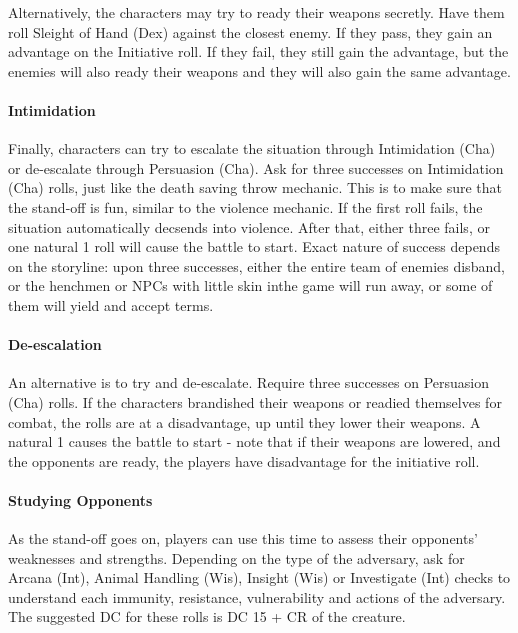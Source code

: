 \documentclass[twocolumn]{dndbook}
\begin{document}
Alternatively, the characters may try to ready their weapons secretly.
Have them roll Sleight of Hand (Dex) against the closest enemy.
If they pass, they gain an advantage on the Initiative roll.
If they fail, they still gain the advantage, but the enemies will also ready their weapons and they will also gain the same advantage.\par

\paragraph*{Intimidation}
Finally, characters can try to escalate the situation through Intimidation (Cha) or de-escalate through Persuasion (Cha).
Ask for three successes on Intimidation (Cha) rolls, just like the death saving throw mechanic.
This is to make sure that the stand-off is fun, similar to the violence mechanic.
If the first roll fails, the situation automatically decsends into violence.
After that, either three fails, or one natural 1 roll will cause the battle to start.
Exact nature of success depends on the storyline:
upon three successes, either the entire team of enemies disband, or the henchmen or NPCs with little skin inthe game will run away, or some of them will yield and accept terms.\par

\paragraph*{De-escalation}
An alternative is to try and de-escalate.
Require three successes on Persuasion (Cha) rolls.
If the characters brandished their weapons or readied themselves for combat, the rolls are at a disadvantage, up until they lower their weapons.
A natural 1 causes the battle to start - note that if their weapons are lowered, and the opponents are ready, the players have disadvantage for the initiative roll.
\par

\paragraph*{Studying Opponents}
As the stand-off goes on, players can use this time to assess their opponents' weaknesses and strengths.
Depending on the type of the adversary, ask for Arcana (Int), Animal Handling (Wis), Insight (Wis) or Investigate (Int) checks to understand each immunity, resistance, vulnerability and actions of the adversary.
The suggested DC for these rolls is DC 15 + CR of the creature.\par
\end{document}
